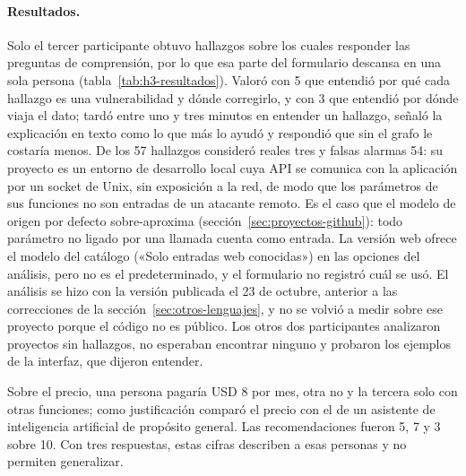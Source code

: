 \paragraph{Resultados.} Solo el tercer participante obtuvo hallazgos
sobre los cuales responder las preguntas de comprensión, por lo que esa
parte del formulario descansa en una sola persona
(tabla~\ref{tab:h3-resultados}). Valoró con 5 que entendió por qué cada
hallazgo es una vulnerabilidad y dónde corregirlo, y con 3 que entendió
por dónde viaja el dato; tardó entre uno y tres minutos en entender un
hallazgo, señaló la explicación en texto como lo que más lo ayudó y
respondió que sin el grafo le costaría menos. De los 57 hallazgos
consideró reales tres y falsas alarmas 54: su proyecto es un entorno de
desarrollo local cuya API se comunica con la aplicación por un socket
de Unix, sin exposición a la red, de modo que los parámetros de sus
funciones no son entradas de un atacante remoto. Es el caso que el
modelo de origen por defecto sobre-aproxima (sección~\ref{sec:proyectos-github}):
todo parámetro no ligado por una llamada cuenta como entrada. La versión
web ofrece el modelo del catálogo («Solo entradas web conocidas») en las
opciones del análisis, pero no es el predeterminado, y el formulario no
registró cuál se usó. El análisis se hizo con la
versión publicada el 23 de octubre, anterior a las correcciones de la
sección~\ref{sec:otros-lenguajes}, y no se volvió a medir sobre ese
proyecto porque el código no es público. Los otros dos participantes
analizaron proyectos sin hallazgos, no esperaban encontrar ninguno y
probaron los ejemplos de la interfaz, que dijeron entender.

Sobre el precio, una persona pagaría USD 8 por mes, otra no y la
tercera solo con otras funciones; como justificación comparó el precio
con el de un asistente de inteligencia artificial de propósito general.
Las recomendaciones fueron 5, 7 y 3 sobre 10. Con tres respuestas,
estas cifras describen a esas personas y no permiten generalizar.

